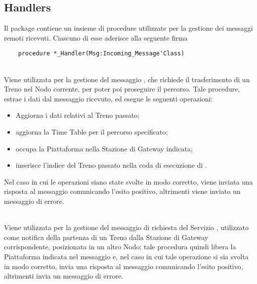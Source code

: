 	\subsection{Handlers}
	
	Il package  contiene un insieme di procedure utilizzate per la gestione dei messaggi remoti ricevuti. Ciascuno di esse aderisce alla seguente firma
\begin{lstlisting}
	procedure *_Handler(Msg:Incoming_Message'Class)
\end{lstlisting}
	\begin{description}
	
		\item {}\\
		Viene utilizzata per la gestione del messaggio , che richiede il trasferimento di un Treno nel Nodo corrente, per poter poi proseguire il percorso. Tale procedure, estrae i dati dal messaggio ricevuto, ed esegue le seguenti operazioni:
			\begin{itemize} 
				\item Aggiorna i dati relativi al Treno passato;
			 	\item aggiorna la Time Table per il percorso specificato;
			 	\item occupa la Piattaforma nella Stazione di Gateway indicata;
			 	\item inserisce l'indice del Treno passato nella coda di esecuzione di . 
			 \end{itemize}
		Nel caso in cui le operazioni siano state svolte in modo corretto, viene inviata una risposta al messaggio comunicando l'esito positivo, altrimenti viene inviato un messaggio di errore.
		
		\item {}\\
		Viene utilizzata per la gestione del messaggio di richiesta del Servizio , utilizzato come notifica della partenza di un Treno dalla Stazione di Gateway corrispondente, posizionata in un altro Nodo; tale procedura quindi libera la Piattaforma indicata nel messaggio e, nel caso in cui tale operazione si sia svolta in modo corretto, invia una risposta al messaggio comunicando l'esito positivo, altrimenti invia un messaggio di errore.
		

\end{description}
